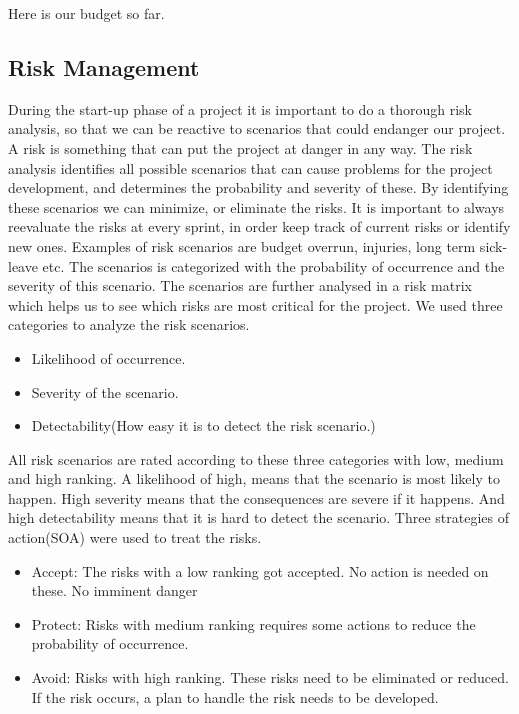 Here is our budget so far.

\subsection{Risk Management}
During the start-up phase of a project it is important to do a thorough risk analysis, so that we can be reactive to scenarios that could endanger our project. A risk is something that can put the project at danger in any way. The risk analysis identifies all possible scenarios that can cause problems for the project development, and determines the probability and severity of these. By identifying these scenarios we can minimize, or eliminate the risks. It is important to always reevaluate the risks at every sprint, in order keep track of current risks or identify new ones.
\newline \newline
Examples of risk scenarios are budget overrun, injuries, long term sick-leave etc. The scenarios is categorized with the probability of occurrence and the severity of this scenario. The scenarios are further analysed in a risk matrix which helps us to see which risks are most critical for the project.\newline \newline
We used three categories to analyze the risk scenarios.
\begin{itemize}
\item{Likelihood of occurrence.}
\item{Severity of the scenario.}
\item{ Detectability(How easy it is to detect the risk scenario.)}
\end{itemize}
All risk scenarios are rated according to these three categories with low, medium and high ranking. A likelihood of high, means that the scenario is most likely to happen. High severity means that the consequences are severe if it happens. And high detectability means that it is hard to detect the scenario.\newline \newline
Three strategies of action(SOA) were used to treat the risks.
\begin{itemize}
\item{Accept: The risks with a low ranking got accepted. No action is needed on these. No imminent danger}
\item{Protect: Risks with medium ranking requires some actions to reduce the probability of occurrence.}
\item{Avoid: Risks with high ranking. These risks need to be eliminated or reduced. If the risk occurs, a plan to handle the risk needs to be developed.}
\end{itemize}
